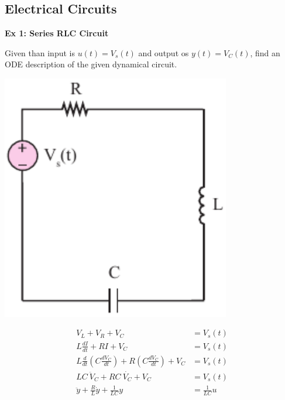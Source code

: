 \documentclass[twoside]{article}
\begin{document}
\subsection*{Electrical Circuits}

\textbf{Ex 1: Series RLC Circuit}

Given than input is $u(t) = V_s(t)$ and output os $y(t) = V_C(t)$, find an ODE 
description of the given dynamical circuit. 

  \begin{minipage}[h]{0.5\linewidth}
    \begin{center}
      \includegraphics[width=0.75\textwidth]{RLC}
    \end{center}
  \end{minipage}
  \begin{minipage}[h]{0.5\linewidth}
    \begin{center}
    {\large
  \begin{align*}
  	V_L + V_R + V_C &= V_s(t)
	\\
	L \frac{d I}{dt} + R I + V_C &= V_s(t)
	\\
	L \frac{d }{dt} \left( C \frac{d V_C}{dt} \right) + R  \left( C \frac{d V_C}{dt} \right) + V_C &= V_s(t)
	\\
	LC \ \ddot{V}_C + RC \ \dot{V_C} + V_C &= V_s(t)
	\\
	\ddot{y} + \frac{R}{L} \dot{y} + \frac{1}{LC} y &= \frac{1}{LC} u
  \end{align*}
  }
    \end{center}
  \end{minipage}
\end{document}
